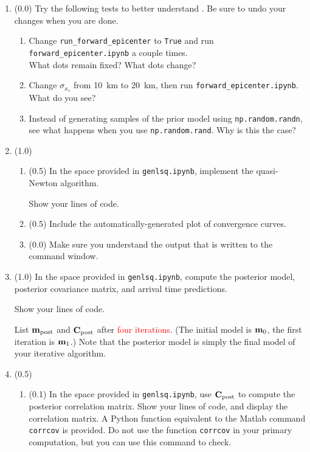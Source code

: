 \documentclass[11pt,titlepage,fleqn]{article}
\begin{document}
\begin{enumerate}

\item (0.0) Try the following tests to better understand . Be sure to undo your changes when you are done.
%
\begin{enumerate}
\item Change \verb+run_forward_epicenter+ to \verb+True+ and run \verb+forward_epicenter.ipynb+ a couple times. \\
What dots remain fixed? What dots change?

\item Change $\sigma_{x_s}$ from 10~km to 20~km, then run \verb+forward_epicenter.ipynb+. What do you see?

\item Instead of generating samples of the prior model using \verb+np.random.randn+, see what happens when you use \verb+np.random.rand+. Why is this the case?
\end{enumerate}

\item (1.0)
%
\begin{enumerate}
\item (0.5) In the space provided in \verb+genlsq.ipynb+, implement the quasi-Newton algorithm.

Show your lines of code.

\item (0.5) Include the automatically-generated plot of convergence curves.

\item (0.0) Make sure you understand the output that is written to the command window.
\end{enumerate}


\item (1.0) In the space provided in \verb+genlsq.ipynb+, compute the posterior model, posterior covariance matrix, and arrival time predictions.

Show your lines of code.

List $\mbox{${\bf m}$}_{\rm post}$ and $\mbox{${\bf C}$}_{\rm post}$ after \textcolor{red}{four iterations}. (The initial model is $\mbox{${\bf m}$}_0$, the first iteration is $\mbox{${\bf m}$}_1$.) Note that the posterior model is simply the final model of your iterative algorithm.


\item (0.5) 
\begin{enumerate}
\item (0.1) In the space provided in \verb+genlsq.ipynb+, use $\mbox{${\bf C}$}_{\rm post}$ to compute the posterior correlation matrix. Show your lines of code, and display the correlation matrix. A Python function equivalent to the Matlab command \verb+corrcov+ is provided. Do not use the function \verb+corrcov+ in your primary computation, but you can use this command to check.


\end{enumerate}
\end{enumerate}
\end{document}
